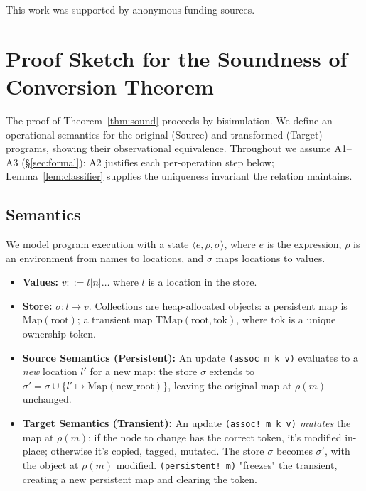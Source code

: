 \documentclass[sigplan,review,anonymous]{acmart}
\begin{document}
\begin{acks}
This work was supported by anonymous funding sources.
\end{acks}




\appendix

\section{Proof Sketch for the Soundness of Conversion Theorem}

The proof of Theorem~\ref{thm:sound} proceeds by bisimulation. We define an operational semantics for the original (Source) and transformed (Target) programs, showing their observational equivalence. Throughout we assume A1--A3 (§\ref{sec:formal}): A2 justifies each per-operation step below; Lemma~\ref{lem:classifier} supplies the uniqueness invariant the relation maintains.

\subsection{Semantics}

We model program execution with a state $\langle e, \rho, \sigma \rangle$, where $e$ is the expression, $\rho$ is an environment from names to locations, and $\sigma$ maps locations to values.

\begin{itemize}
    \item \textbf{Values:} $v ::= l | n | \dots$ where $l$ is a location in the store.
    \item \textbf{Store:} $\sigma: l \mapsto v$. Collections are heap-allocated objects: a persistent map is $\text{Map}(\text{root})$; a transient map $\text{TMap}(\text{root}, \text{tok})$, where $\text{tok}$ is a unique ownership token.
    \item \textbf{Source Semantics (Persistent):} An update \texttt{(assoc m k v)} evaluates to a \emph{new} location $l'$ for a new map: the store $\sigma$ extends to $\sigma' = \sigma \cup \{l' \mapsto \text{Map}(\text{new\_root})\}$, leaving the original map at $\rho(m)$ unchanged.
    \item \textbf{Target Semantics (Transient):} An update \texttt{(assoc! m k v)} \emph{mutates} the map at $\rho(m)$: if the node to change has the correct token, it's modified in-place; otherwise it's copied, tagged, mutated. The store $\sigma$ becomes $\sigma'$, with the object at $\rho(m)$ modified. \texttt{(persistent! m)} "freezes" the transient, creating a new persistent map and clearing the token.
\end{itemize}
\end{document}
